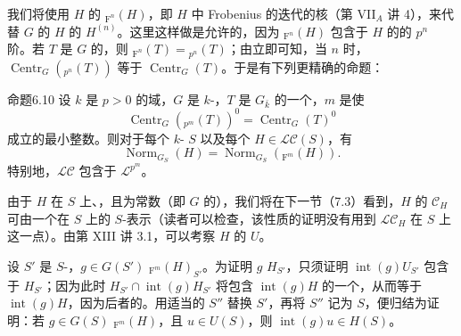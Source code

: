 我们将使用 $H$ 的 ${}_{\mathrm F^n}(H)$，即 $H$ 中 Frobenius 的迭代的核（第 VII$_A$ 讲 4），来代替 $G$ 的 $H$ 的 $H^{(n)}$。这里这样做是允许的，因为 ${}_{\mathrm F^n}(H)$ 包含于 $H$ 的的 $p^n$ 阶。若 $T$ 是 $G$ 的，则 ${}_{\mathrm F^n}(T)={}_{p^n}(T)$；由立即可知，当 $n$ 时，$\operatorname{Centr}_G({}_{p^n}(T))$ 等于 $\operatorname{Centr}_G(T)$。于是有下列更精确的命题：
\begin{SGAresult}{命题}{6.10}
设 $k$ 是 $p>0$ 的域，$G$ 是 $k$-，$T$ 是 $G_{\bar k}$ 的一个，$m$ 是使
\[\operatorname{Centr}_G({}_{p^m}(T))^0=\operatorname{Centr}_G(T)^0\]
成立的最小整数。则对于每个 $k$- $S$ 以及每个 $H\in\mathscr L\mathscr C(S)$，有
\[\operatorname{Norm}_{G_S}(H)=\operatorname{Norm}_{G_S}({}_{\mathrm F^m}(H)).\]
特别地，$\mathscr L\mathscr C$ 包含于 $\mathscr L^{p^m}$。
\end{SGAresult}
由于 $H$ 在 $S$ 上、，且为常数（即 $G$ 的），我们将在下一节（7.3）看到，$H$ 的 $\mathscr C_H$ 可由一个在 $S$ 上的 $S$-表示（读者可以检查，该性质的证明没有用到 $\mathscr L\mathscr C_H$ 在 $S$ 上这一点）。由第 XIII 讲 3.1，可以考察 $H$ 的 $U$。

设 $S'$ 是 $S$-，$g\in G(S')$  ${}_{\mathrm F^m}(H)_{S'}$。为证明 $g$  $H_{S'}$，只须证明 $\operatorname{int}(g)U_{S'}$ 包含于 $H_{S'}$；因为此时 $H_{S'}\cap\operatorname{int}(g)H_{S'}$ 将包含 $\operatorname{int}(g)H$ 的一个，从而等于
$\operatorname{int}(g)H$，因为后者的。用适当的 $S''$ 替换 $S'$，再将 $S''$ 记为 $S$，便归结为证明：若 $g\in G(S)$  ${}_{\mathrm F^m}(H)$，且 $u\in U(S)$，则 $\operatorname{int}(g)u\in H(S)$。


